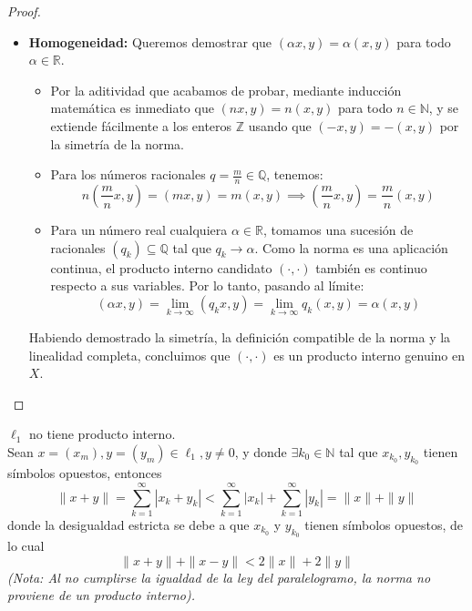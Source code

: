 \begin{teo}
\begin{proof}
\begin{description}
\begin{itemize}
            \vspace{0.2cm}
            \item \textbf{Homogeneidad:} Queremos demostrar que $(\alpha x, y) = \alpha (x, y)$ para todo $\alpha \in \mathbb{R}$.
            \begin{itemize}
                \item Por la aditividad que acabamos de probar, mediante inducción matemática es inmediato que $(n x, y) = n(x, y)$ para todo $n \in \mathbb{N}$, y se extiende fácilmente a los enteros $\mathbb{Z}$ usando que $(-x, y) = -(x,y)$ por la simetría de la norma.
                \item Para los números racionales $q = \frac{m}{n} \in \mathbb{Q}$, tenemos:
                \begin{equation*}
                    n \left( \frac{m}{n} x, y \right) = \left( m x, y \right) = m (x, y) \implies \left( \frac{m}{n} x, y \right) = \frac{m}{n} (x, y)
                \end{equation*}
                \item Para un número real cualquiera $\alpha \in \mathbb{R}$, tomamos una sucesión de racionales $(q_k) \subseteq \mathbb{Q}$ tal que $q_k \to \alpha$. Como la norma es una aplicación continua, el producto interno candidato $(\cdot, \cdot)$ también es continuo respecto a sus variables. Por lo tanto, pasando al límite:
                \begin{equation*}
                    (\alpha x, y) = \lim_{k \to \infty} (q_k x, y) = \lim_{k \to \infty} q_k (x, y) = \alpha (x, y)
                \end{equation*}
            \end{itemize}
            Habiendo demostrado la simetría, la definición compatible de la norma y la linealidad completa, concluimos que $(\cdot, \cdot)$ es un producto interno genuino en $X$.
        \end{itemize}
    \end{description}
\end{proof}
\end{teo}

\begin{ejercicio}
    $\ell_1$ no tiene producto interno. \\

    \noindent
    Sean $x = (x_m), y = (y_m) \in \ell_1, y \neq 0$, y donde $\exists k_0 \in \mathbb{N}$ tal que $x_{k_0}, y_{k_0}$ tienen símbolos opuestos, entonces
    \begin{equation*}
        \|x+y\| = \sum_{k=1}^{\infty} |x_k + y_k| < \sum_{k=1}^{\infty} |x_k| + \sum_{k=1}^{\infty} |y_k| = \|x\| + \|y\|
    \end{equation*}
    donde la desigualdad estricta se debe a que $x_{k_0}$ y $y_{k_0}$ tienen símbolos opuestos, de lo cual 
    \begin{equation*}
        \|x+y\| + \|x-y\| < 2\|x\| + 2\|y\|
    \end{equation*}
    \textit{(Nota: Al no cumplirse la igualdad de la ley del paralelogramo, la norma no proviene de un producto interno).}
\end{ejercicio}

